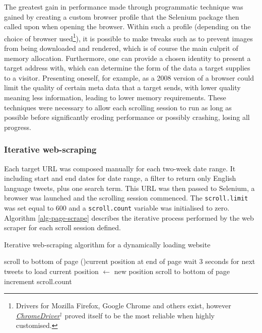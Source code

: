 \documentclass{article}
\begin{document}
The greatest gain in performance made through programmatic technique was gained by creating a custom browser profile that the Selenium package then called upon when opening the browser. Within such a profile (depending on the choice of browser used\footnote{Drivers for Mozilla Firefox, Google Chrome and others exist, however \href{https://sites.google.com/a/chromium.org/chromedriver/getting-started}{\emph{ChromeDriver$^{\dag{}}$}} proved itself to be the most reliable when highly customised.}), it is possible to make tweaks such as to prevent images from being downloaded and rendered, which is of course the main culprit of memory allocation. Furthermore, one can provide a chosen identity to present a target address with, which can determine the form of the data a target supplies to a visitor. Presenting oneself, for example, as a 2008 version of a browser could limit the quality of certain meta data that a target sends, with lower quality meaning less information, leading to lower memory requirements.
These techniques were necessary to allow each scrolling session to run as long as possible before significantly eroding performance or possibly crashing, losing all progress.


\subsubsection{Iterative web-scraping \label{iterative-scraping}}
\label{sec-3-3-3}

Each target URL was composed manually for each two-week date range. It including start and end dates for date range, a filter to return only English language tweets, plus one search term. This URL was then passed to Selenium, a browser was launched and the scrolling session commenced. The \texttt{scroll.limit} was set equal to 600 and a \texttt{scroll.count} variable was initialised to zero. Algorithm \eqref{alg-page-scrape} describes the iterative process performed by the web scraper for each scroll session defined.

\vspace{5mm}

\begin{algorithm}[H]
  \caption{Iterative web-scraping algorithm for a dynamically loading website}
  \label{alg-page-scrape}

  \BlankLine
  \BlankLine
  \BlankLine
  
   {
    scroll to bottom of page\;
    \eIf(){current position at end of page} {
      wait 3 seconds for next tweets to load\; 
      current position $\leftarrow$ new position\;
    } 
    {
      scroll to bottom of page\;
    }
    increment scroll.count
  }
  \BlankLine
  \BlankLine
   
\end{algorithm}
\end{document}
